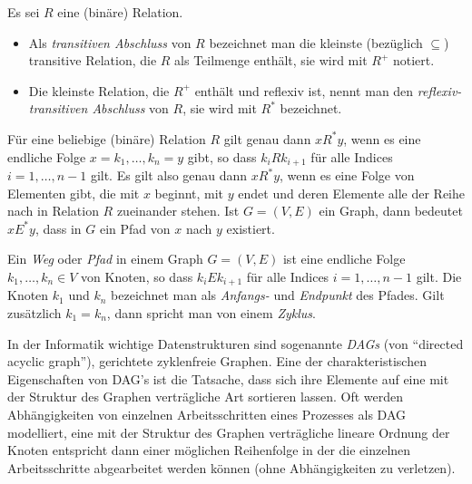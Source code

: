     \begin{df}
        Es sei $R$ eine (bin\"are) Relation.
        \begin{itemize}
            \item Als \textit{transitiven Abschluss} von $R$ bezeichnet man die kleinste
            (bezüglich $\subseteq$) transitive Relation, die $R$ als Teilmenge enthält,
            sie wird mit $R^+$ notiert.
            \item Die kleinste Relation, die $R^+$ enthält und reflexiv ist, nennt man den
            \textit{reflexiv-transitiven Abschluss} von $R$, sie wird mit $R^*$ bezeichnet.
        \end{itemize}
    \end{df}

    \begin{rk}
        F\"ur eine beliebige (bin\"are) Relation $R$ gilt genau dann $xR^*y$, wenn es
        eine endliche Folge $x=k_1,\dots,k_n=y$ gibt, so dass $k_iRk_{i+1}$ f\"ur alle
        Indices $i=1,\dots,n-1$ gilt. Es gilt also genau dann $xR^*y$, wenn es eine Folge von
        Elementen gibt, die mit $x$ beginnt, mit $y$ endet und deren Elemente alle der Reihe
        nach in Relation $R$ zueinander stehen. Ist $G=(V,E)$ ein Graph, dann bedeutet
        $xE^*y$, dass in $G$ ein Pfad von $x$ nach $y$ existiert.
    \end{rk}

    \begin{df}
        Ein \textit{Weg} oder \textit{Pfad} in einem Graph $G=(V,E)$ ist eine endliche Folge
        $k_1,\dots,k_n\in V$ von Knoten, so dass $k_iEk_{i+1}$ f\"ur alle Indices
        $i=1,\dots,n-1$ gilt. Die Knoten $k_1$ und $k_n$ bezeichnet man als \textit{Anfangs-}
        und \textit{Endpunkt} des Pfades. Gilt zusätzlich $k_1=k_n$, dann spricht man von einem \textit{Zyklus}.
    \end{df}


    \begin{rk}
        In der Informatik wichtige Datenstrukturen sind sogenannte \textit{DAGs} (von ``directed acyclic graph''), gerichtete zyklenfreie Graphen. Eine der charakteristischen Eigenschaften von DAG's ist die Tatsache, dass sich ihre Elemente auf eine mit der Struktur des Graphen verträgliche Art sortieren lassen. Oft werden Abhängigkeiten von einzelnen Arbeitsschritten eines Prozesses als DAG modelliert, eine mit der Struktur des Graphen verträgliche lineare Ordnung der Knoten entspricht dann einer möglichen Reihenfolge in der die einzelnen Arbeitsschritte abgearbeitet werden können (ohne Abhängigkeiten zu verletzen).
    \end{rk}


